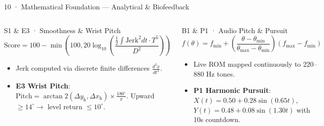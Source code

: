\documentclass[aspectratio=169,11pt]{beamer}
\begin{document}
\begin{frame}{10 · Mathematical Foundation — Analytical \& Biofeedback}
\begin{columns}[T]
\begin{block}{S1 \& E3 · Smoothness \& Wrist Pitch}
$$\text{Score} = 100 - \min\left(100, 20\log_{10}\left(\frac{\frac{1}{2}\int \text{Jerk}^2 dt \cdot T^5}{D^2}\right)\right)$$
\begin{itemize}
    \setlength{\itemsep}{1pt}
    \item Jerk computed via discrete finite differences $\frac{d^3x}{dt^3}$.
    \item \textbf{E3 Wrist Pitch}: $\text{Pitch} = \arctan2(\Delta y_{\text{h}}, \Delta x_{\text{h}}) \times \frac{180^\circ}{\pi}$. Upward $\ge 14^\circ \rightarrow$ level return $\le 10^\circ$.
\end{itemize}
\end{block}

\begin{block}{B1 \& P1 · Audio Pitch \& Pursuit}
$$f(\theta) = f_{\min} + \left(\frac{\theta - \theta_{\min}}{\theta_{\max} - \theta_{\min}}\right)(f_{\max} - f_{\min})$$
\begin{itemize}
    \setlength{\itemsep}{1pt}
    \item Live ROM mapped continuously to 220--880 Hz tones.
    \item \textbf{P1 Harmonic Pursuit}: $X(t) = 0.50 + 0.28\sin(0.65t)$, $Y(t) = 0.48 + 0.08\sin(1.30t)$ with 10s countdown.
\end{itemize}
\end{block}
\end{columns}
\end{frame}
\end{document}
